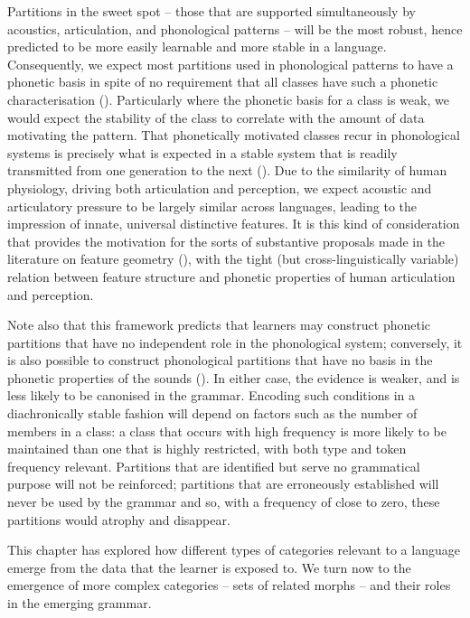 Partitions in the sweet spot -- those that are supported simultaneously by acoustics, articulation, and phonological patterns  -- will be the most robust, hence predicted to be more easily learnable and more stable in a language. Consequently, we expect most partitions used in phonological patterns to have a phonetic basis in spite of no requirement that all classes have such a phonetic characterisation (\citealt{Mielke:2008}). Particularly where the phonetic basis for a class is weak, we would expect the stability of the class to correlate with the amount of data motivating the pattern. That phonetically motivated classes recur in phonological systems is precisely what is expected in a stable system that is readily transmitted from one generation to the next (\citealt{Blevins:2004}). Due to the similarity of human physiology, driving both articulation and perception, we expect acoustic and articulatory pressure to be largely similar across languages, leading to the impression of innate, universal distinctive features. It is this kind of consideration that provides the motivation for the sorts of substantive proposals made in the literature on feature geometry (\citealt{Mohanan:1983, Clements:1985geometry, Sagey:1986, McCarthy:1988, Clements+:1995}), with the tight (but cross-linguistically variable) relation between feature structure and phonetic properties of human articulation and perception.   

Note also that this framework predicts that learners may construct phonetic partitions that have no independent role in the phonological system; conversely, it is also possible to construct phonological partitions that have no basis in the phonetic properties of the sounds (\citealt{Anderson:1981, Mielke:2008}). In either case, the evidence is weaker, and is less likely to be canonised in the grammar. Encoding such conditions in a diachronically stable fashion will depend on factors such as the number of members in a class: a class that occurs with high frequency is more likely to be maintained than one that is highly restricted, with both type and token frequency relevant. Partitions that are identified but serve no grammatical purpose will not be reinforced; partitions that are erroneously established will never be used by the grammar and so, with a frequency of close to zero, these partitions would atrophy and disappear. 

This chapter has explored how different types of categories relevant to a language emerge from the data that the learner is exposed to. We turn now to the emergence of more complex categories -- sets of related morphs -- and their roles in the emerging grammar.
